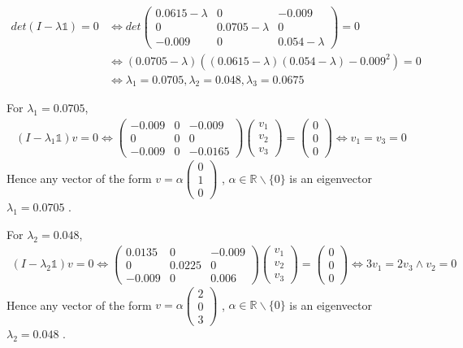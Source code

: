 \documentclass[a4paper,12pt,titlepage]{article}
\begin{document}
\subsection{}
\begin{align*}
det(I-\lambda\mathds{1})=0&\Leftrightarrow det\begin{pmatrix}
0.0615-\lambda&0&-0.009\\0&0.0705-\lambda&0\\-0.009&0&0.054-\lambda\end{pmatrix}=0\\
&\Leftrightarrow (0.0705-\lambda)((0.0615-\lambda)(0.054-\lambda)-0.009^2)=0\\
&\Leftrightarrow\lambda_1=0.0705,\lambda_2=0.048,\lambda_3=0.0675
\end{align*}

For $\lambda_1=0.0705$,
\begin{align*}
(I-\lambda_1\mathds{1})v=0\Leftrightarrow\begin{pmatrix}
-0.009&0&-0.009\\0&0&0\\-0.009&0&-0.0165\end{pmatrix}\begin{pmatrix}
v_1\\v_2\\v_3\end{pmatrix}=\begin{pmatrix}
0\\0\\0\end{pmatrix}\Leftrightarrow v_1=v_3=0
\end{align*}
Hence any vector of the form $v = \alpha\begin{pmatrix}
0\\1\\0\end{pmatrix}$
, $\alpha \in \mathbb{R} \backslash \lbrace0\rbrace$ is an eigenvector $\lambda_1 = 0.0705$ .

For $\lambda_2=0.048$,
\begin{align*}
(I-\lambda_2\mathds{1})v=0\Leftrightarrow\begin{pmatrix}
0.0135&0&-0.009\\0&0.0225&0\\-0.009&0&0.006\end{pmatrix}\begin{pmatrix}
v_1\\v_2\\v_3\end{pmatrix}=\begin{pmatrix}
0\\0\\0\end{pmatrix}\Leftrightarrow 3v_1=2v_3\wedge v_2=0
\end{align*}
Hence any vector of the form $v = \alpha\begin{pmatrix}
2\\0\\3\end{pmatrix}$
, $\alpha \in \mathbb{R} \backslash \lbrace0\rbrace$ is an eigenvector $\lambda_2 = 0.048$ .
\end{document}
